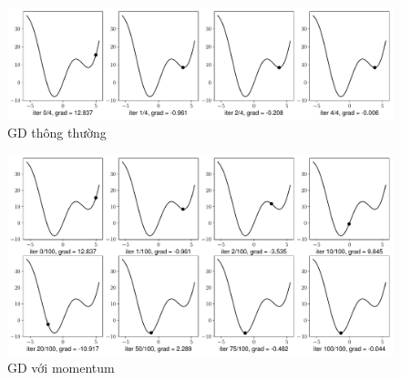 \begin{figure}[t]
\centering
    \includegraphics[width = \textwidth]{ebookML_src/src/grad_descent/gd1d_nomomentum.pdf}
    \caption[]{GD thông thường}
    \label{fig:8_nomomen}
\end{figure}

\begin{figure}[t]
\centering
    \includegraphics[width = \textwidth]{ebookML_src/src/grad_descent/gd1d_momentum_0.pdf}
    \caption[]{GD với momentum}
    \label{fig:8_momen}
\end{figure}

 
 
 

